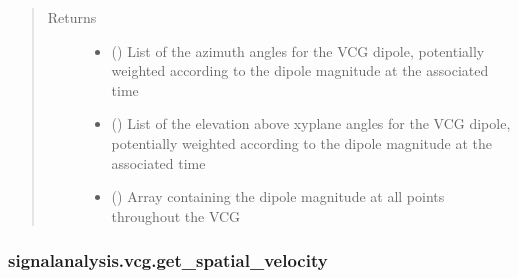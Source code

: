 \documentclass[letterpaper,10pt,english]{sphinxmanual}
\begin{document}
\begin{fulllineitems}
\begin{quote}
\begin{description}
\begin{itemize}
\end{itemize}

\item[{Returns}] \leavevmode
\sphinxAtStartPar
\begin{itemize}
\item {} 
\sphinxAtStartPar
{} () \textendash{} List of the azimuth angles for the VCG dipole, potentially weighted according to the dipole magnitude at the
associated time

\item {} 
\sphinxAtStartPar
{} () \textendash{} List of the elevation above xy\sphinxhyphen{}plane angles for the VCG dipole, potentially weighted according to the dipole
magnitude at the associated time

\item {} 
\sphinxAtStartPar
{} () \textendash{} Array containing the dipole magnitude at all points throughout the VCG

\end{itemize}


\end{description}\end{quote}

\end{fulllineitems}



\subsubsection{signalanalysis.vcg.get\_spatial\_velocity}
\label{\detokenize{_autosummary/signalanalysis.vcg.get_spatial_velocity:signalanalysis-vcg-get-spatial-velocity}}\label{\detokenize{_autosummary/signalanalysis.vcg.get_spatial_velocity::doc}}
\end{document}
